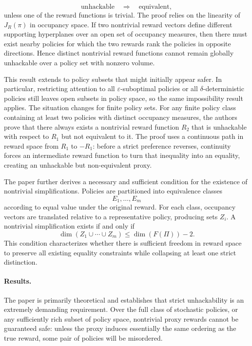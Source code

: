 \documentclass[11pt]{article}
\begin{document}
\[
\text{unhackable}
\quad\Longrightarrow\quad
\text{equivalent},
\]
unless one of the reward functions is trivial.
The proof relies on the linearity of $J_R(\pi)$ in occupancy space. If two nontrivial reward vectors define different supporting hyperplanes over an open set of occupancy measures, then there must exist nearby policies for which the two rewards rank the policies in opposite directions. Hence distinct nontrivial reward functions cannot remain globally unhackable over a policy set with nonzero volume.

This result extends to policy subsets that might initially appear safer. In particular, restricting attention to all $\varepsilon$-suboptimal policies or all $\delta$-deterministic policies still leaves open subsets in policy space, so the same impossibility result applies.
The situation changes for finite policy sets. For any finite policy class containing at least two policies with distinct occupancy measures, the authors prove that there always exists a nontrivial reward function $R_2$ that is unhackable with respect to $R_1$ but not equivalent to it. The proof uses a continuous path in reward space from $R_1$ to $-R_1$: before a strict preference reverses, continuity forces an intermediate reward function to turn that inequality into an equality, creating an unhackable but non-equivalent proxy.

The paper further derives a necessary and sufficient condition for the existence of nontrivial simplifications. Policies are partitioned into equivalence classes
\[
E_1,\ldots,E_m
\]
according to equal value under the original reward. For each class, occupancy vectors are translated relative to a representative policy, producing sets $Z_i$. A nontrivial simplification exists if and only if
\[
\dim
\left(
Z_1\cup\cdots\cup Z_m
\right)
\leq
\dim(F(\Pi))-2.
\]
This condition characterizes whether there is sufficient freedom in reward space to preserve all existing equality constraints while collapsing at least one strict distinction.

\paragraph{Results.}

The paper is primarily theoretical and establishes that strict unhackability is an extremely demanding requirement. Over the full class of stochastic policies, or any sufficiently rich subset of policy space, nontrivial proxy rewards cannot be guaranteed safe: unless the proxy induces essentially the same ordering as the true reward, some pair of policies will be misordered.
\end{document}

